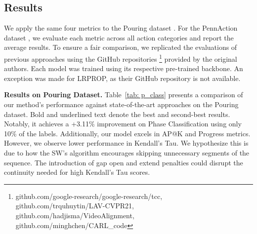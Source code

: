\subsection{Results}

We apply the same four metrics to the Pouring dataset \cite{2017_tcn}. For the PennAction dataset \cite{2013_pennaction}, we evaluate each metric across all action categories and report the average results. 
To ensure a fair comparison, we replicated the evaluations of previous approaches using the GitHub repositories \footnote{github.com/google-research/google-research/tcc, github.com/trquhuytin/LAV-CVPR21,\\github.com/hadjisma/VideoAlignment, github.com/minghchen/CARL\_code} provided by the original authors. 
Each model was trained using its respective pre-trained backbone. 
An exception was made for LRPROP, as their GitHub repository is not available.

\noindent \textbf{Results on Pouring Dataset.} 
Table~\ref{tab: p_class} presents a comparison of our method's performance against state-of-the-art approaches on the Pouring dataset. Bold and underlined text denote the best and second-best results.
Notably, it achieves a +3.11\% improvement on Phase Classification using only 10\% of the labels. Additionally, our model excels in AP@K and Progress metrics.
However, we observe lower performance in Kendall's Tau. We hypothesize this is due to how the SW's algorithm encourages skipping unnecessary segments of the sequence. The introduction of gap open and extend penalties could disrupt the continuity needed for high Kendall's Tau scores.

